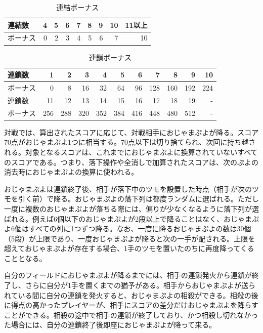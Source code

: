 \documentclass[12pt]{jreport}
\begin{document}
\begin{table}[tb]
\begin{center}
\caption{連結ボーナス} \label{tab:connect_bonus}
\begin{tabular}{|l|r|r|r|r|r|r|r|r|} \hline
連結数 & 4 & 5 & 6 & 7 & 8 & 9 & 10 & 11以上\\ \hline
ボーナス & 0 & 2 & 3 & 4 & 5 & 6 & 7 & 10\\ \hline
\end{tabular}
\end{center}
\end{table}

\begin{table}[tb]
\begin{center}
\caption{連鎖ボーナス} \label{tab:chain_bonus}
\begin{tabular}{|l|r|r|r|r|r|r|r|r|r|r|} \hline
連鎖数 & 1 & 2 & 3 & 4 & 5 & 6 & 7 & 8 & 9 & 10\\ \hline
ボーナス & 0 & 8 & 16 & 32 & 64 & 96 & 128 & 160 & 192 & 224\\ \hline \hline
連鎖数 & 11 & 12 & 13 & 14 & 15 & 16 & 17 & 18 & 19 & -\\ \hline
ボーナス & 256 & 288 & 320 & 352 & 384 & 416 & 448 & 480 & 512 & -\\ \hline
\end{tabular}
\end{center}
\end{table}

対戦では、算出されたスコアに応じて、対戦相手におじゃまぷよが降る。スコア70点がおじゃまぷよ1つに相当する。70点以下は切り捨てられ、次回に持ち越される。対象となるスコアは、これまでにおじゃまぷよに換算されていないすべてのスコアである。つまり、落下操作や全消しで加算されたスコアは、次のぷよの消去時におじゃまぷよの換算に使われる。

おじゃまぷよは連鎖終了後、相手が落下中のツモを設置した時点（相手が次のツモを引く前）で降る。おじゃまぷよの落下列は都度ランダムに選ばれる。ただし一度に複数のおじゃまぷよが落ちる際には、偏りが少なくなるように落下列が選ばれる。例えば6個以下のおじゃまぷよが2段以上で降ることはなく、おじゃまぷよ6個はすべての列に1つずつ降る。なお、一度に降るおじゃまぷよの数は30個（5段）が上限であり、一度おじゃまぷよが降ると次の一手が配される。上限を超えておじゃまぷよが存在する場合、1手のツモを置いたのちに再度降ってくることとなる。

自分のフィールドにおじゃまぷよが降るまでには、相手の連鎖発火から連鎖が終了し、さらに自分が1手を置くまでの猶予がある。相手からおじゃまぷよが送られている間に自分の連鎖を発火すると、おじゃまぷよの相殺ができる。相殺の後に得点の高かったプレイヤーが、相手にスコアの差分だけおじゃまぷよを降らすことができる。相殺の途中で相手の連鎖が終了しており、かつ相殺し切れなかった場合には、自分の連鎖終了後即座におじゃまぷよが降って来る。
\end{document}
